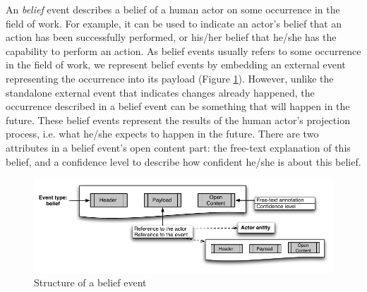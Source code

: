 An \emph{belief} event describes a belief of a human actor on some occurrence in the field of work. For example, it can be used to indicate an actor's belief that an action has been successfully performed, or his/her belief that he/she has the capability to perform an action. As belief events usually refers to some occurrence in the field of work, we represent belief events by embedding an external event representing the occurrence into its payload (Figure \ref{fig:belief_event}). However, unlike the standalone external event that indicates changes already happened, the occurrence described in a belief event can be something that will happen in the future. These belief events represent the results of the human actor's projection process, i.e. what he/she expects to happen in the future. There are two attributes in a belief event's open content part: the free-text explanation of this belief, and a confidence level to describe how confident he/she is about this belief.
\begin{figure}[htbp] %
	\centering
	\includegraphics{belief_event.pdf} 
	\caption{Structure of a belief event}
	\label{fig:belief_event}
\end{figure}

